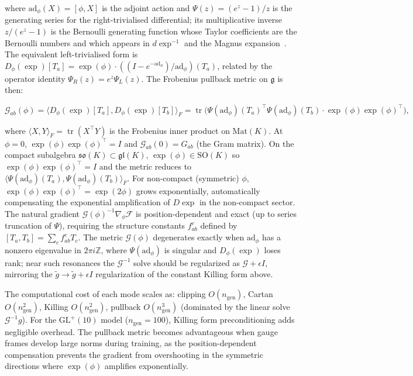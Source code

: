 \documentclass[twoside,11pt]{article}
\begin{document}
where $\mathrm{ad}_\phi(X) = [\phi, X]$ is the adjoint action and $\Psi(z) = (e^z - 1)/z$ is the generating series for the right-trivialised differential; its multiplicative inverse $z/(e^z-1)$ is the Bernoulli generating function whose Taylor coefficients are the Bernoulli numbers and which appears in $d\exp^{-1}$ and the Magnus expansion~\citep{Hall2015}. The equivalent left-trivialised form is $D_\phi(\exp)[T_a] = \exp(\phi) \cdot ((I - e^{-\mathrm{ad}_\phi})/\mathrm{ad}_\phi)(T_a)$, related by the operator identity $\Psi_R(z) = e^z \Psi_L(z)$. The Frobenius pullback metric on $\mathfrak{g}$ is then:

\begin{equation}
\mathcal{G}_{ab}(\phi)
=\langle D_\phi(\exp)[T_a], D_\phi(\exp)[T_b]\rangle_F
= \operatorname{tr}\bigl(\Psi(\mathrm{ad}_\phi)(T_a)^\top \Psi(\mathrm{ad}_\phi)(T_b) \cdot \exp(\phi)\exp(\phi)^\top\bigr),
\label{eq:pullback_metric}
\end{equation}

where $\langle X, Y \rangle_F = \operatorname{tr}(X^\top Y)$ is the Frobenius inner product on $\mathrm{Mat}(K)$. At $\phi = 0$, $\exp(\phi)\exp(\phi)^\top = I$ and $\mathcal{G}_{ab}(0) = G_{ab}$ (the Gram matrix). On the compact subalgebra $\mathfrak{so}(K) \subset \mathfrak{gl}(K)$, $\exp(\phi) \in \mathrm{SO}(K)$ so $\exp(\phi)\exp(\phi)^\top = I$ and the metric reduces to $\langle \Psi(\mathrm{ad}_\phi)(T_a), \Psi(\mathrm{ad}_\phi)(T_b)\rangle_F$. For non-compact (symmetric) $\phi$, $\exp(\phi)\exp(\phi)^\top = \exp(2\phi)$ grows exponentially, automatically compensating the exponential amplification of $D\exp$ in the non-compact sector. The natural gradient $\mathcal{G}(\phi)^{-1} \nabla_\phi \mathcal{F}$ is position-dependent and exact (up to series truncation of $\Psi$), requiring the structure constants $f^c_{ab}$ defined by $[T_a, T_b] = \sum_c f^c_{ab} T_c$. The metric $\mathcal{G}(\phi)$ degenerates exactly when $\mathrm{ad}_\phi$ has a nonzero eigenvalue in $2\pi i\mathbb{Z}$, where $\Psi(\mathrm{ad}_\phi)$ is singular and $D_\phi(\exp)$ loses rank; near such resonances the $\mathcal{G}^{-1}$ solve should be regularized as $\mathcal{G} + \epsilon I$, mirroring the $\tilde{g} \to \tilde{g} + \epsilon I$ regularization of the constant Killing form above.

The computational cost of each mode scales as: clipping $O(n_{\mathrm{gen}})$, Cartan $O(n_{\mathrm{gen}}^2)$, Killing $O(n_{\mathrm{gen}}^2)$, pullback $O(n_{\mathrm{gen}}^3)$ (dominated by the linear solve $\mathcal{G}^{-1} g$). For the $\mathrm{GL}^+(10)$ model ($n_{\mathrm{gen}} = 100$), Killing form preconditioning adds negligible overhead. The pullback metric becomes advantageous when gauge frames develop large norms during training, as the position-dependent compensation prevents the gradient from overshooting in the symmetric directions where $\exp(\phi)$ amplifies exponentially.
\end{document}
